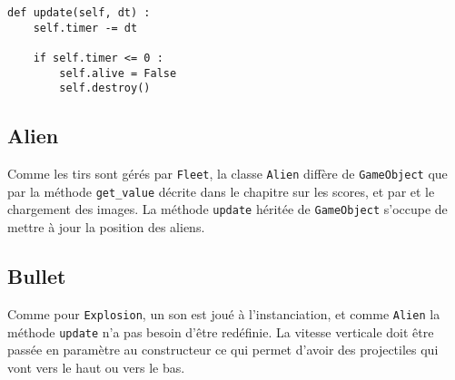 \documentclass[12pt]{article}
\begin{document}
\begin{verbatim}
def update(self, dt) :
	self.timer -= dt

	if self.timer <= 0 :
		self.alive = False
		self.destroy()
\end{verbatim}

	\subsection{Alien}
	Comme les tirs sont gérés par \texttt{Fleet}, la classe \texttt{Alien} diffère de \texttt{GameObject} que par la méthode \texttt{get\_value} décrite dans le chapitre sur les scores, et par et le chargement des images. La méthode \texttt{update} héritée de \texttt{GameObject} s'occupe de mettre à jour la position des aliens.


	\subsection{Bullet}
	Comme pour \texttt{Explosion}, un son est joué à l'instanciation, et comme \texttt{Alien} la méthode \texttt{update} n'a pas besoin d'être redéfinie. La vitesse verticale doit être passée en paramètre au constructeur ce qui permet d'avoir des projectiles qui vont vers le haut ou vers le bas.
\end{document}
